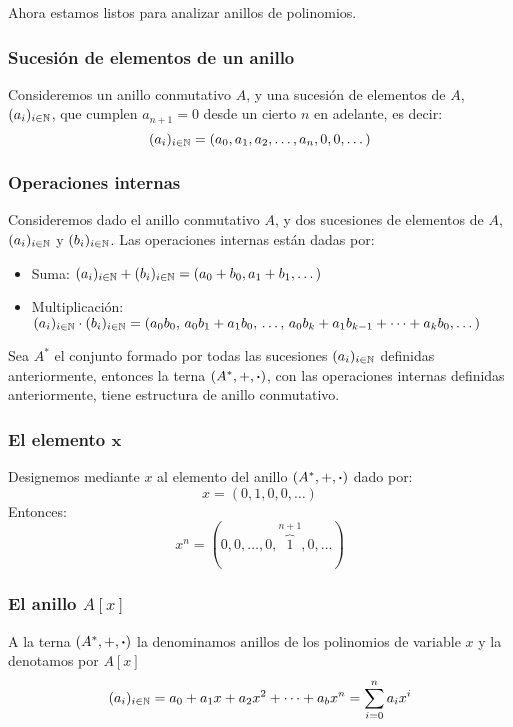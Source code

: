Ahora estamos listos para analizar anillos de polinomios.

\subsubsection{Sucesión de elementos de un anillo}

Consideremos un anillo conmutativo $A$, y una sucesión de elementos de $A$, $(a_i)_{i \in \mathbb{N}}$, que cumplen $a_{n+1} = 0$ desde un cierto $n$ en adelante, es decir:
\[ (a_i)_{i \in \mathbb{N}} = (a_0, a_1, a_2, \dots, a_n, 0, 0, \dots)\]

\subsubsection{Operaciones internas}
Consideremos dado el anillo conmutativo $A$, y dos sucesiones de elementos de $A$, $(a_i)_{i \in \mathbb{N}}$ y $(b_i)_{i \in \mathbb{N}}$. Las operaciones internas están dadas por:
\begin{itemize}
	\item Suma: $(a_i)_{i \in \mathbb{N}} + (b_i)_{i \in \mathbb{N}} = (a_0 + b_0, a_1 + b_1, \dots)$
	\item Multiplicación: $(a_i)_{i \in \mathbb{N}} \cdot (b_i)_{i \in \mathbb{N}} = (a_0b_0, \, a_0b_1 + a_1b_0, \, \dots, \, a_0b_k + a_1 b_{k-1} + \dots + a_k b_0, \dots)$
\end{itemize}

\begin{fmd-theorem}
	Sea $A^*$ el conjunto formado por todas las sucesiones $(a_i)_{i \in \mathbb{N}}$ definidas anteriormente, entonces la terna $(A^*, +, \boldsymbol{\cdot})$, con las operaciones internas definidas anteriormente, tiene estructura de anillo conmutativo.
\end{fmd-theorem}

\subsubsection{El elemento $\mathbf{x}$}

Designemos mediante $x$ al elemento del anillo $(A^*, +, \boldsymbol{\cdot})$ dado por:
\[ x = (0, 1, 0, 0, \dots) \]
Entonces:
\[ x^n = (0, 0, \dots, 0, \overbrace{1}^{n+1}, 0, \dots) \]

\subsubsection{El anillo $A[x]$}
A la terna $(A^*, +, \boldsymbol{\cdot})$ la denominamos anillos de los polinomios de variable $x$ y la denotamos por $A[x]$
\[ (a_i)_{i\in \mathbb{N}} = a_0 + a_1 x + a_2 x^2 + \dots + a_b x^n = \sum_{i=0}^{n} a_i x^i \]

